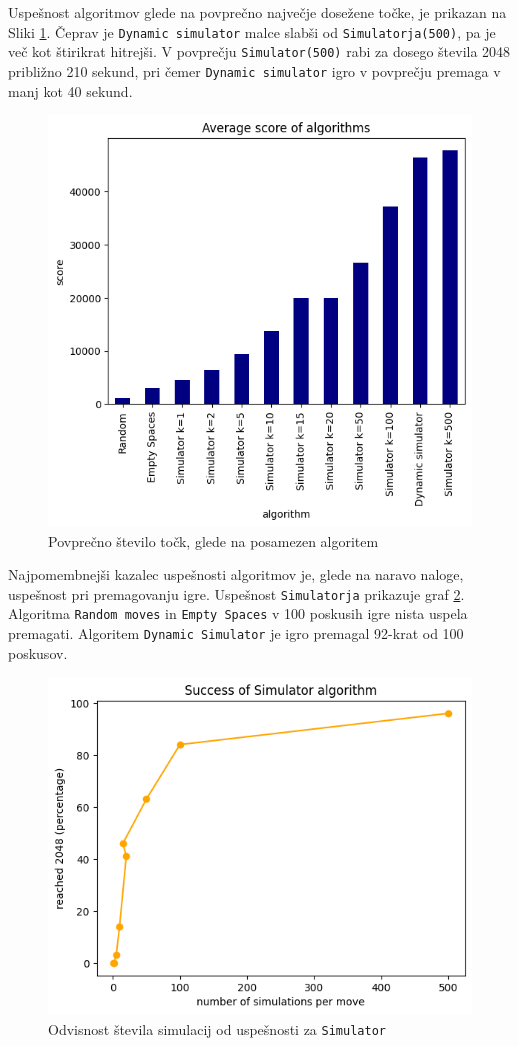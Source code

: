 \documentclass{article}
\begin{document}
Uspešnost algoritmov glede na povprečno največje dosežene točke, je prikazan na Sliki \ref{score}. Čeprav je \texttt{Dynamic simulator} malce slabši od \texttt{Simulatorja(500)}, pa je več kot štirikrat hitrejši. V povprečju \texttt{Simulator(500)} rabi za dosego števila 2048 približno 210 sekund, pri čemer \texttt{Dynamic simulator} igro v povprečju premaga v manj kot 40 sekund.

\begin{figure}[ht!]
\centering
\includegraphics[width=12cm]{score.png}
\caption{Povprečno število točk, glede na posamezen algoritem}
\label{score}
\end{figure}

Najpomembnejši kazalec uspešnosti algoritmov je, glede na naravo naloge, uspešnost pri premagovanju igre. Uspešnost \texttt{Simulatorja} prikazuje graf \ref{performance}. Algoritma \texttt{Random moves} in \texttt{Empty Spaces} v 100 poskusih igre nista uspela premagati. Algoritem \texttt{Dynamic Simulator} je igro premagal 92-krat od 100 poskusov.

\begin{figure}[ht!]
\centering
\includegraphics[width=12cm]{simulator.png}
\caption{Odvisnost števila simulacij od uspešnosti za \texttt{Simulator}}
\label{performance}
\end{figure}
\end{document}
